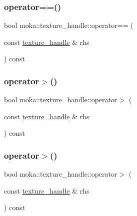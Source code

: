 \mbox{\label{structmoka_1_1texture__handle_a3b3c615c09b9b4e36ae970286ed4612b}} 
\subsubsection{\texorpdfstring{operator==()}{operator==()}\hspace{0.1cm}{\footnotesize\ttfamily [2/2]}}
{\footnotesize\ttfamily bool moka\+::texture\+\_\+handle\+::operator== (\begin{DoxyParamCaption}\item[{const \mbox{\hyperlink{structmoka_1_1texture__handle}{texture\+\_\+handle}} \&}]{rhs }\end{DoxyParamCaption}) const}

\mbox{\label{structmoka_1_1texture__handle_abddd549d0ed65bb69d4542a5d4f7569a}} 
\subsubsection{\texorpdfstring{operator$>$()}{operator>()}\hspace{0.1cm}{\footnotesize\ttfamily [1/2]}}
{\footnotesize\ttfamily bool moka\+::texture\+\_\+handle\+::operator$>$ (\begin{DoxyParamCaption}\item[{const \mbox{\hyperlink{structmoka_1_1texture__handle}{texture\+\_\+handle}} \&}]{rhs }\end{DoxyParamCaption}) const}

\mbox{\label{structmoka_1_1texture__handle_abddd549d0ed65bb69d4542a5d4f7569a}} 
\subsubsection{\texorpdfstring{operator$>$()}{operator>()}\hspace{0.1cm}{\footnotesize\ttfamily [2/2]}}
{\footnotesize\ttfamily bool moka\+::texture\+\_\+handle\+::operator$>$ (\begin{DoxyParamCaption}\item[{const \mbox{\hyperlink{structmoka_1_1texture__handle}{texture\+\_\+handle}} \&}]{rhs }\end{DoxyParamCaption}) const}

